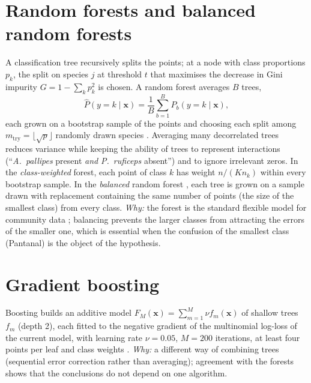 \documentclass[10pt,a4paper,twocolumn]{article}
\newcommand{\taxon}[1]{\textit{#1}}
\begin{document}
\section{Random forests and balanced random forests}\label{app:rf}
A classification tree recursively splits the points; at a node with class proportions $p_k$, the
split on species $j$ at threshold $t$ that maximises the decrease in Gini impurity
$G=1-\sum_k p_k^2$ is chosen. A random forest averages $B$ trees,
\[
\hat P(y=k\mid\mathbf{x})=\frac{1}{B}\sum_{b=1}^{B}\hat P_b(y=k\mid\mathbf{x}),
\]
each grown on a bootstrap sample of the points and choosing each split among $m_{\mathrm{try}}=
\lfloor\sqrt{p}\rfloor$ randomly drawn species \citep{breiman2001}. Averaging many decorrelated trees
reduces variance while keeping the ability of trees to represent interactions (``\taxon{A.~pallipes}
present \emph{and} \taxon{P.~ruficeps} absent'') and to ignore irrelevant zeros. In the
\emph{class-weighted} forest, each point of class $k$ has weight $n/(Kn_k)$ within every bootstrap
sample. In the \emph{balanced} random forest \citep{chen2004}, each tree is grown on a sample drawn
with replacement containing the same number of points (the size of the smallest class) from every
class. \emph{Why:} the forest is the standard flexible model for community data
\citep{cutler2007}; balancing prevents the larger classes from attracting the errors of the smaller
one, which is essential when the confusion of the smallest class (Pantanal) is the object of the
hypothesis.

\section{Gradient boosting}\label{app:boosting}
Boosting builds an additive model $F_M(\mathbf{x})=\sum_{m=1}^{M}\nu f_m(\mathbf{x})$ of shallow trees
$f_m$ (depth 2), each fitted to the negative gradient of the multinomial log-loss of the current model,
with learning rate $\nu=0.05$, $M=200$ iterations, at least four points per leaf and class weights
\citep{friedman2001}. \emph{Why:} a different way of combining trees (sequential error correction
rather than averaging); agreement with the forests shows that the conclusions do not depend on one
algorithm.
\end{document}
